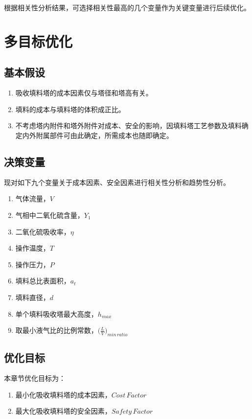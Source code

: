 根据相关性分析结果，可选择相关性最高的几个变量作为关键变量进行后续优化。

\section{多目标优化}

\subsection{基本假设}

\begin{enumerate}
	\item 吸收填料塔的成本因素仅与塔径和塔高有关。
	\item 填料的成本与填料塔的体积成正比。
	\item 不考虑塔内附件和塔外附件对成本、安全的影响，因填料塔工艺参数及填料确定内外附属部件可由此确定，所需成本也随即确定。
\end{enumerate}

\subsection{决策变量}
现对如下九个变量关于成本因素、安全因素进行相关性分析和趋势性分析。

\begin{enumerate}
	\item 气体流量，$V$
	\item 气相中二氧化硫含量，$Y_{1}$
	\item 二氧化硫吸收率，$\eta$
	\item 操作温度，$T$
	\item 操作压力，$P$
	\item 填料总比表面积，$a_{t}$
	\item 填料直径，$d$
	\item 单个填料吸收塔最大高度，$h_{max}$
	\item 取最小液气比的比例常数，$\big(\frac{L}{V}\big)_{min\,ratio}$
\end{enumerate}

\subsection{优化目标}

本章节优化目标为：
\begin{enumerate}
	\item 最小化吸收填料塔的成本因素，$Cost\,Factor$
	\item 最大化吸收填料塔的安全因素，$Safety\,Factor$
\end{enumerate}

